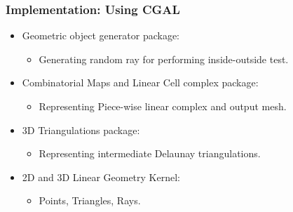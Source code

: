 \documentclass{beamer}
\begin{document}
	\begin{frame}
		\frametitle{Implementation: Using CGAL}
			\begin{itemize}
				\item Geometric object generator package:
					\begin{itemize}
						\item Generating random ray for performing inside-outside test.	
					\end{itemize}
				\item Combinatorial Maps and Linear Cell complex package:
					\begin{itemize}
						\item Representing Piece-wise linear complex and output mesh.	
					\end{itemize}
				\item 3D Triangulations package:
					\begin{itemize}
						\item Representing intermediate Delaunay triangulations.	
					\end{itemize}		
				\item 2D and 3D Linear Geometry Kernel:
					\begin{itemize}
						\item Points, Triangles, Rays.	
					\end{itemize}		
			\end{itemize}		
	\end{frame}	
\end{document}
